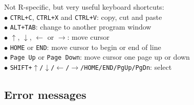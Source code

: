 \documentclass[a4paper,11pt,twocolumn,tablecaptionabove]{scrartcl}
\begin{document}
\noindent Not R-specific, but very useful keyboard shortcuts:\\
$\bullet$ \texttt{CTRL+C}, \texttt{CTRL+X} and \texttt{CTRL+V}: copy, cut and paste\\
$\bullet$ \texttt{ALT+TAB}: change to another program window\\
$\bullet$ $\uparrow$, $\downarrow$, $\leftarrow$ or $\rightarrow$: move cursor\\
$\bullet$ \texttt{HOME} or \texttt{END}: move cursor to begin or end of line\\
$\bullet$ \texttt{Page Up} or \texttt{Page Down}: move cursor one page up or down\\
$\bullet$ \texttt{SHIFT+$\uparrow$/$\downarrow$/$\leftarrow$/$\rightarrow$/HOME/END/PgUp/PgDn}: select\\

\subsection{Error messages}
\end{document}
